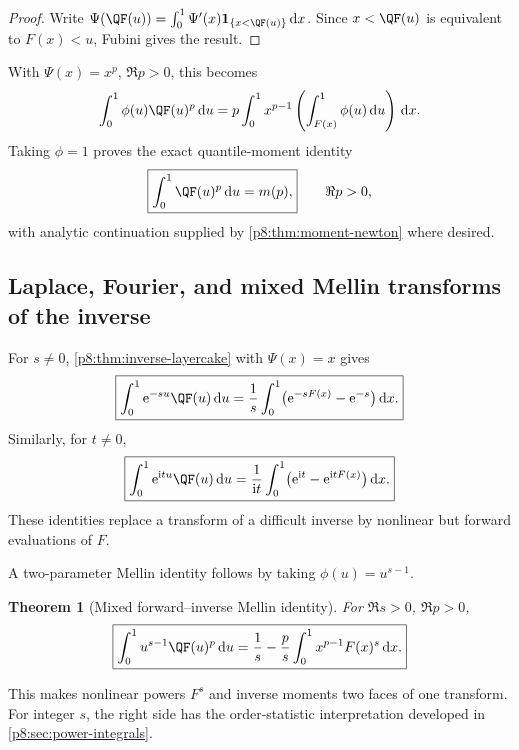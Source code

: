 \documentclass[11pt,oneside]{article}
\newtheorem{theorem}{Theorem}[section]
\theoremstyle{definition}
\theoremstyle{remark}
\newcommand{\dd}{\,\mathrm d}
\newcommand{\e}{\mathrm e}
\newcommand{\ii}{\mathrm i}
\newcommand{\1}{\mathbf 1}
\begin{document}
\begin{proof}
Write
\(\Psi(\QF(u))=\int_0^1\Psi'(x)\mathbf1_{\{x<\QF(u)\}}\dd x\).
Since \(x<\QF(u)\) is equivalent to \(F(x)<u\), Fubini gives the result.
\end{proof}

With \(\Psi(x)=x^p\), \(\Re p>0\), this becomes
\begin{equation}
 \int_0^1\phi(u)\QF(u)^p\dd u
 =p\int_0^1x^{p-1}\left(\int_{F(x)}^1\phi(u)\dd u\right)\dd x.
 \label{p8:eq:inverse-power-layercake}
\end{equation}
Taking \(\phi=1\) proves the exact quantile-moment identity
\begin{equation}
 \boxed{\int_0^1\QF(u)^p\dd u=m(p),}
 \qquad \Re p>0,
 \label{p8:eq:quantile-moments}
\end{equation}
with analytic continuation supplied by \cref{p8:thm:moment-newton} where desired.

\subsection{Laplace, Fourier, and mixed Mellin transforms of the inverse}

For \(s\ne0\), \cref{p8:thm:inverse-layercake} with \(\Psi(x)=x\) gives
\begin{equation}
 \boxed{
 \int_0^1\e^{-su}\QF(u)\dd u
 =\frac1s\int_0^1\bigl(\e^{-sF(x)}-\e^{-s}\bigr)\dd x.}
 \label{p8:eq:Q-Laplace}
\end{equation}
Similarly, for \(t\ne0\),
\begin{equation}
 \boxed{
 \int_0^1\e^{\ii tu}\QF(u)\dd u
 =\frac1{\ii t}\int_0^1\bigl(\e^{\ii t}-\e^{\ii tF(x)}\bigr)\dd x.}
 \label{p8:eq:Q-Fourier}
\end{equation}
These identities replace a transform of a difficult inverse by nonlinear but
forward evaluations of \(F\).

A two-parameter Mellin identity follows by taking \(\phi(u)=u^{s-1}\).

\begin{theorem}[Mixed forward--inverse Mellin identity]
\label{p8:thm:mixed-Mellin-Q}
For \(\Re s>0\), \(\Re p>0\),
\begin{equation}
 \boxed{
 \int_0^1u^{s-1}\QF(u)^p\dd u
 =\frac1s-\frac p s\int_0^1x^{p-1}F(x)^s\dd x.}
 \label{p8:eq:mixed-Mellin-Q}
\end{equation}
\statusprovedPartll
\end{theorem}

This makes nonlinear powers \(F^s\) and inverse moments two faces of one
transform.  For integer \(s\), the right side has the order-statistic
interpretation developed in \cref{p8:sec:power-integrals}.
\end{document}
